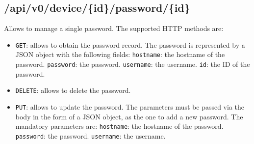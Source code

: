 \subsection{/api/v0/device/\{id\}/password/\{id\}}
Allows to manage a single password. The supported HTTP methods are:

\begin{itemize}
    \item \texttt{GET}: allows to obtain the password record. The password is represented by a JSON object with the following fields:
        \subitem \texttt{hostname}: the hostname of the password.
        \subitem \texttt{password}: the password.
        \subitem \texttt{username}: the username.
        \subitem \texttt{id}: the ID of the password.
    \item \texttt{DELETE}: allows to delete the password.
    \item \texttt{PUT}: allows to update the password. The parameters must be passed via the body in the form of a JSON object, as the one to add a new password. The mandatory parameters are:
        \subitem \texttt{hostname}: the hostname of the password.
        \subitem \texttt{password}: the password.
        \subitem \texttt{username}: the username.
\end{itemize}